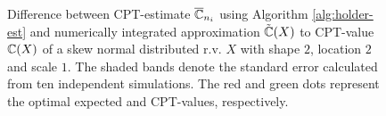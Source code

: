 \begin{figure}
    \centering
{}
			\caption{Difference between CPT-estimate $\overline {\mathbb{C}}_{n_i}$ using Algorithm \ref{alg:holder-est} and numerically integrated approximation $\tilde {\mathbb{C}}(X)$ to CPT-value $\mathbb{C}(X)$ of a skew normal distributed r.v. $X$ with shape $2$, location $2$ and scale $1$. The shaded bands denote the standard error calculated from ten independent simulations. The red and green dots represent the optimal expected and CPT-values, respectively. }
      \label{fig:cpt-est} 
			\end{figure}
